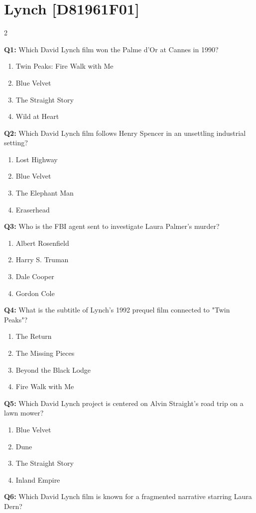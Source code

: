 \documentclass[10pt]{article}
\begin{document}
\section*{Lynch \footnotesize [D81961F01]}
\begin{multicols}{2}

\textbf{Q1:} Which David Lynch film won the Palme d'Or at Cannes in 1990?

\begin{enumerate}[label=\arabic*.]
\item Twin Peaks: Fire Walk with Me
\item Blue Velvet
\item The Straight Story
\item Wild at Heart
\end{enumerate}
\textbf{Q2:} Which David Lynch film follows Henry Spencer in an unsettling industrial setting?

\begin{enumerate}[label=\arabic*.]
\item Lost Highway
\item Blue Velvet
\item The Elephant Man
\item Eraserhead
\end{enumerate}
\textbf{Q3:} Who is the FBI agent sent to investigate Laura Palmer's murder?

\begin{enumerate}[label=\arabic*.]
\item Albert Rosenfield
\item Harry S. Truman
\item Dale Cooper
\item Gordon Cole
\end{enumerate}
\textbf{Q4:} What is the subtitle of Lynch's 1992 prequel film connected to "Twin Peaks"?

\begin{enumerate}[label=\arabic*.]
\item The Return
\item The Missing Pieces
\item Beyond the Black Lodge
\item Fire Walk with Me
\end{enumerate}
\textbf{Q5:} Which David Lynch project is centered on Alvin Straight's road trip on a lawn mower?

\begin{enumerate}[label=\arabic*.]
\item Blue Velvet
\item Dune
\item The Straight Story
\item Inland Empire
\end{enumerate}
\textbf{Q6:} Which David Lynch film is known for a fragmented narrative starring Laura Dern?


\end{multicols}
\end{document}
